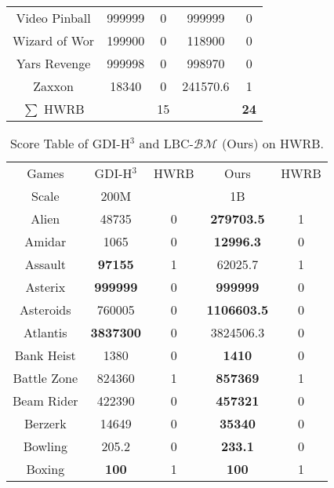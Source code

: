 \begin{table}[!hb]
\begin{center}
\begin{tabular}{c cc cc }
        Video Pinball & 999999 & 0  & 999999 & 0  \\  
        Wizard of Wor & 199900 & 0  & 118900 & 0  \\  
        Yars Revenge & 999998 & 0  & 998970 & 0  \\  
        Zaxxon & 18340 & 0  & 241570.6 & 1 \\ 
        \midrule
         $\sum$ HWRB & & 15& & \textbf{24}  \\ 
         \bottomrule
\end{tabular}
\end{center}
\end{table}

\clearpage



\begin{table}[!hb]
\footnotesize
\begin{center}
\caption{Score Table of GDI-H$^3$ and LBC-$\mathcal{BM}$ (Ours) on HWRB.}
\label{Tab:Score table of GDI and LBC on HWRB.}
\setlength{\tabcolsep}{1.0pt}
\begin{tabular}{c cc cc }
\toprule
Games & GDI-H$^3$ & HWRB & Ours &HWRB   \\ 
        Scale & 200M & ~ & 1B &    \\  \midrule
        Alien & 48735	             & 0 & \textbf{279703.5} & 1 \\  
        Amidar &1065              & 0 & \textbf{12996.3} & 0 \\  
        Assault &\textbf{97155}	             & 1  & 62025.7 & 1 \\  
        Asterix &\textbf{{999999}}   & 0 & \textbf{999999} & 0 \\  
        Asteroids &{760005}            & 0 & \textbf{1106603.5} & 0 \\  
        Atlantis &\textbf{{3837300}}           & 0   & 3824506.3 & 0 \\  
        Bank Heist &1380              & 0  & \textbf{1410} & 0 \\   
        Battle Zone &824360            & 1 & \textbf{857369} & 1 \\  
        Beam Rider &422390            & 0 & \textbf{457321} & 0 \\  
        Berzerk &14649             & 0 & \textbf{35340} & 0 \\    
        Bowling &205.2             & 0 & \textbf{233.1} & 0 \\  
        Boxing &\textbf{{100}}      & 1  & \textbf{100} &1 \\  

\end{tabular}
\end{center}
\end{table}
